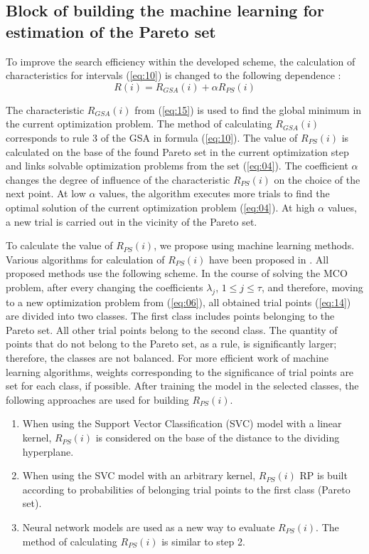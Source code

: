 \documentclass[runningheads]{llncs}
\begin{document}
\subsection{Block of  building the machine learning for estimation of the Pareto set}
\label{subsec34}

To improve the search efficiency within the developed scheme, the calculation of characteristics for intervals (\ref{eq:10}) is changed to the following dependence \cite{Konnov2025}:
\begin{equation}
    \label{eq:15}
    R(i) = R_{GSA} (i) +  \alpha R_{PS} (i)
\end{equation}

The characteristic $R_{GSA}(i)$ from (\ref{eq:15}) is used to find the global minimum in the current optimization problem. The method of calculating $R_{GSA}(i)$ corresponds to rule 3 of the GSA in formula (\ref{eq:10}). The value of $R_{PS}(i)$ is calculated on the base of the found Pareto set in the current optimization step and links solvable optimization problems from the set (\ref{eq:04}). The coefficient $\alpha$ changes the degree of influence of the characteristic  $R_{PS}(i)$ on the choice of the next point. At low $\alpha$ values, the algorithm executes more trials to find the optimal solution of the current optimization problem (\ref{eq:04}). At high $\alpha$ values, a new trial is carried out in the vicinity of the Pareto set. 

To calculate the value of $R_{PS}(i)$, we propose using machine learning methods. Various algorithms for calculation of  $R_{PS}(i)$ have been proposed in \cite{Konnov2025}. All proposed methods use the following scheme. In the course of solving the MCO problem, after every changing the coefficients  $\lambda_j$, $1 \leq j \leq \tau$, and therefore, moving to a new optimization problem from (\ref{eq:06}), all obtained trial points (\ref{eq:14}) are divided into two classes. The first class includes points belonging to the Pareto set. All other trial points belong to the second class. The quantity of points that do not belong to the Pareto set, as a rule, is significantly larger; therefore, the classes are not balanced. For more efficient work of machine learning algorithms, weights corresponding to the significance of trial points are set for each class, if possible. After training the model in the selected classes, the following approaches are used for building $R_{PS}(i)$.
\begin{enumerate}
	\item When using the Support Vector Classification (SVC) model with a linear kernel, $R_{PS}(i)$ is considered on the base of the distance to the dividing hyperplane.
	\item	When using the SVC model with an arbitrary kernel, $R_{PS}(i)$ RP is built according to probabilities of belonging trial points to the first class (Pareto set).
	\item Neural network models are used as a new way to evaluate $R_{PS}(i)$. The method of calculating $R_{PS}(i)$ is similar to step 2.
\end{enumerate}
\end{document}
